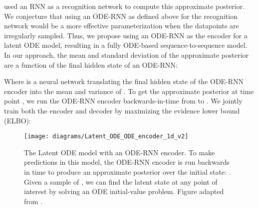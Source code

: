 \documentclass{article}
\begin{document}
\begin{table}[b]
\centering
\vspace{-4mm}
\begin{minipage}[c]{0.48\linewidth}
    \caption{Definition of hidden state  between observation times  and  in autoregressive models.
    In standard~RNNs, the hidden state does not change between updates.
    In ODE-RNNs, the hidden state is defined by an ODE, and is additionally updated by another network at each observation. } \label{tab:state_dynamics}
 \end{minipage}\hfill \begin{minipage}[c]{0.48\linewidth}
 \end{minipage}
\end{table}




\citet{NeuralODE} used an RNN as a recognition network to compute this approximate posterior.
We conjecture that using an ODE-RNN as defined above for the recognition network would be a more effective parameterization when the datapoints are irregularly sampled.
Thus, we propose using an ODE-RNN as the encoder for a latent ODE model, resulting in a fully ODE-based sequence-to-sequence model.
In our approach, the mean and standard deviation of the approximate posterior  are a function of the final hidden state of an ODE-RNN:

Where  is a neural network translating the final hidden state of the ODE-RNN encoder into the mean and variance of .
To get the approximate posterior at time point , we run the ODE-RNN encoder backwards-in-time from  to .
We jointly train both the encoder and decoder by maximizing the evidence lower bound (ELBO):

\begin{figure}
	\centering
	\texttt{[image: diagrams/Latent\_ODE\_ODE\_encoder\_1d\_v2]}
	\caption{The Latent ODE model with an ODE-RNN encoder.
	To make predictions in this model, the ODE-RNN encoder is run backwards in time to produce an approximate posterior over the initial state: .
	Given a sample of , we can find the latent state at any point of interest by solving an ODE initial-value problem.
	Figure adapted from \citet{NeuralODE}.}
	\label{fig:latent-ode}
	\vspace{-3mm}
\end{figure}
\end{document}
